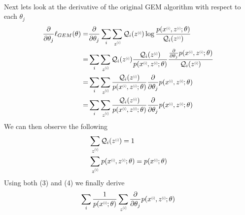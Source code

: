 \documentclass{article}
\newcommand{\supi}{\scalebox{0.6}[0.75]{$^{(i)}$}}
\begin{document}
\begin{enumerate}[label=(\alph*)]
\begin{align*}
    \end{align*}
    Next lets look at the derivative of the original GEM algorithm with respect to each $\theta_j$
    \begin{align*}
        \frac{\partial}{\partial\theta_j}\ell_{GEM}(\theta) =&{} \frac{\partial}{\partial\theta_j}\sum_i\sum_{z\supi}\mathcal{Q}_i(z\supi)\log\frac{p(x\supi,z\supi;\theta)}{\mathcal{Q}_i(z\supi)}\\
        =&{} \sum_i\sum_{z\supi}\mathcal{Q}_i(z\supi)\frac{\mathcal{Q}_i(z\supi)}{p(x\supi,z\supi;\theta)}\frac{\frac{\partial}{\partial\theta_j}p(x\supi,z\supi;\theta)}{\mathcal{Q}_i(z\supi)}\\
         =&{} \sum_i\sum_{z\supi}\frac{\mathcal{Q}_i(z\supi)}{p(x\supi,z\supi;\theta)}\frac{\partial}{\partial\theta_j}p(x\supi,z\supi;\theta)\\
         =&{} \sum_i\sum_{z\supi}\frac{\mathcal{Q}_i(z\supi)}{p(x\supi,z\supi;\theta)}\frac{\partial}{\partial\theta_j}p(x\supi,z\supi;\theta)
    \end{align*}
    We can then observe the following
    \begin{align}
        &{}\sum_{z\supi}\mathcal{Q}_i(z\supi) = 1\\
        &{}\sum_{z\supi}p(x\supi,z\supi;\theta) = p(x\supi;\theta)
    \end{align}
    Using both (3) and (4) we finally derive
    \begin{align*}
        \sum_i\frac{1}{p(x\supi;\theta)}\sum_{z\supi}\frac{\partial}{\partial\theta_j}p(x\supi,z\supi;\theta)
    \end{align*}
\end{enumerate}
\end{document}
